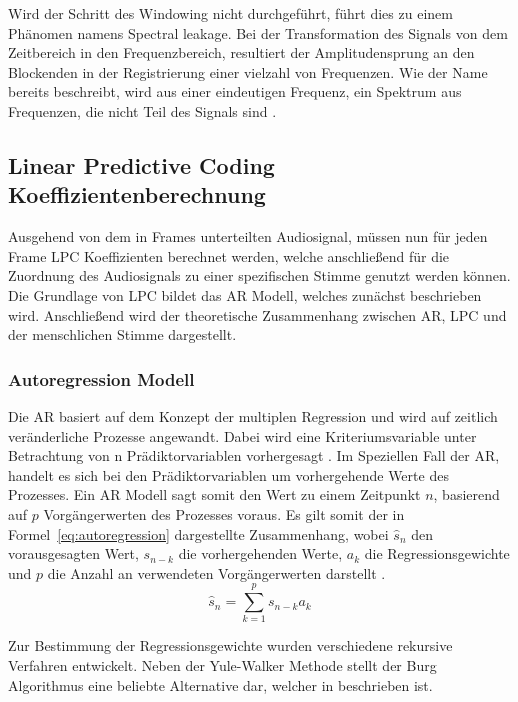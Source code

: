 Wird der Schritt des Windowing nicht durchgeführt, führt dies zu einem Phänomen namens Spectral leakage.
Bei der Transformation des Signals von dem Zeitbereich in den Frequenzbereich, resultiert der Amplitudensprung an den Blockenden in der Registrierung einer vielzahl von Frequenzen.
Wie der Name bereits beschreibt, wird aus einer eindeutigen Frequenz, ein Spektrum aus Frequenzen, die nicht Teil des Signals sind \autocite[vgl.][S. 1296]{wu_new_2012}.

\subsection{Linear Predictive Coding Koeffizientenberechnung}
Ausgehend von dem in Frames unterteilten Audiosignal, müssen nun für jeden Frame \ac{LPC} Koeffizienten berechnet werden, welche anschließend für die Zuordnung des Audiosignals zu einer spezifischen Stimme genutzt werden können.
Die Grundlage von \ac{LPC} bildet das \ac{AR} Modell, welches zunächst beschrieben wird.
Anschließend wird der theoretische Zusammenhang zwischen \ac{AR}, \ac{LPC} und der menschlichen Stimme dargestellt.

\subsubsection{Autoregression Modell}
Die \ac{AR} basiert auf dem Konzept der multiplen Regression und wird auf zeitlich veränderliche Prozesse angewandt.
Dabei wird eine Kriteriumsvariable unter Betrachtung von n Prädiktorvariablen vorhergesagt \autocite[vgl.][S. 37-38]{canela_multiple_2019}.
Im Speziellen Fall der \ac{AR}, handelt es sich bei den Prädiktorvariablen um vorhergehende Werte des Prozesses.
Ein \ac{AR} Modell sagt somit den Wert zu einem Zeitpunkt $n$, basierend auf $p$ Vorgängerwerten des Prozesses voraus.
Es gilt somit der in Formel~\ref{eq:autoregression} dargestellte Zusammenhang, wobei $\hat{s}_n$ den vorausgesagten Wert, $s_{n-k}$ die vorhergehenden Werte, $a_{k}$ die Regressionsgewichte und $p$ die Anzahl an verwendeten Vorgängerwerten darstellt \autocite[][S. 1304]{atal_effectiveness_1974}.
\begin{equation}
  \hat{s}_{n} = \sum_{k=1}^{p} s_{n-k}a_{k}
  \label{eq:autoregression}
\end{equation}

Zur Bestimmung der Regressionsgewichte wurden verschiedene rekursive Verfahren entwickelt.
Neben der Yule-Walker Methode stellt der Burg Algorithmus eine beliebte Alternative dar, welcher in \citeauthor[][S. 443]{marple_new_1980} beschrieben ist.

